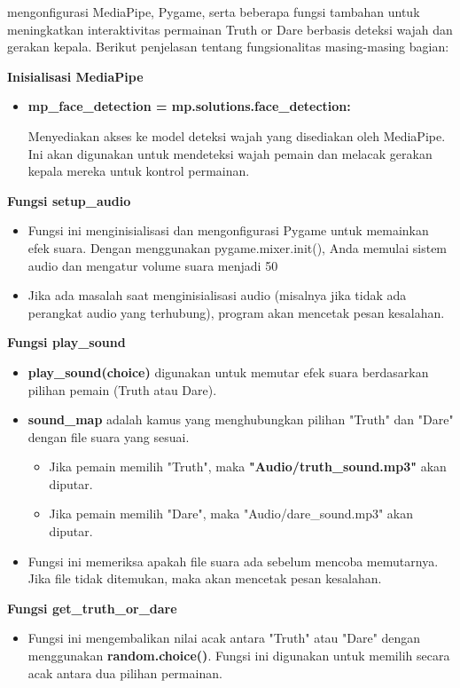\documentclass[11pt,a4paper]{article}
\begin{document}
mengonfigurasi MediaPipe, Pygame, serta beberapa fungsi tambahan untuk meningkatkan interaktivitas permainan Truth or Dare berbasis deteksi wajah dan gerakan kepala. Berikut penjelasan tentang fungsionalitas masing-masing bagian:

\textbf{Inisialisasi MediaPipe}
\begin{itemize}
    \item \textbf{mp\_face\_detection = mp.solutions.face\_detection:}

    Menyediakan akses ke model deteksi wajah yang disediakan oleh MediaPipe. Ini akan digunakan untuk mendeteksi wajah pemain dan melacak gerakan kepala mereka untuk kontrol permainan.
\end{itemize}


\textbf{Fungsi setup\_audio}
\begin{itemize}
    \item Fungsi ini menginisialisasi dan mengonfigurasi Pygame untuk memainkan efek suara. Dengan menggunakan pygame.mixer.init(), Anda memulai sistem audio dan mengatur volume suara menjadi 50%
    \item Jika ada masalah saat menginisialisasi audio (misalnya jika tidak ada perangkat audio yang terhubung), program akan mencetak pesan kesalahan.
\end{itemize}

\textbf{Fungsi play\_sound}
\begin{itemize}
    \item \textbf{play\_sound(choice)} digunakan untuk memutar efek suara berdasarkan pilihan pemain (Truth atau Dare).
    \item \textbf{sound\_map} adalah kamus yang menghubungkan pilihan "Truth" dan "Dare" dengan file suara yang sesuai.
    \begin{itemize}
        \item Jika pemain memilih "Truth", maka \textbf{"Audio/truth\_sound.mp3"} akan diputar.
        \item Jika pemain memilih "Dare", maka "Audio/dare\_sound.mp3" akan diputar.
    \end{itemize}
    \item Fungsi ini memeriksa apakah file suara ada sebelum mencoba memutarnya. Jika file tidak ditemukan, maka akan mencetak pesan kesalahan.
\end{itemize}

\textbf{Fungsi get\_truth\_or\_dare}
\begin{itemize}
    \item Fungsi ini mengembalikan nilai acak antara "Truth" atau "Dare" dengan menggunakan \textbf{random.choice()}. Fungsi ini digunakan untuk memilih secara acak antara dua pilihan permainan.
\end{itemize}
\end{document}
